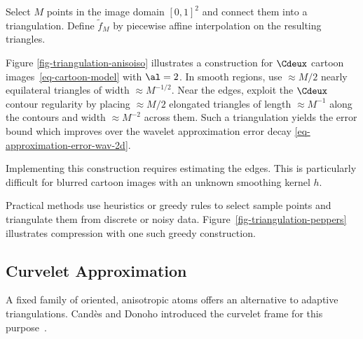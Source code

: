 
Select $M$ points in the image domain $[0,1]^2$ and connect them into a triangulation. Define $\tilde f_M$ by piecewise affine interpolation on the resulting triangles.


Figure \ref{fig-triangulation-anisoiso} illustrates a construction for $\Cdeux$ cartoon images~\eqref{eq-cartoon-model} with $\al=2$. In smooth regions, use $\approx M/2$ nearly equilateral triangles of width $\approx M^{-1/2}$. Near the edges, exploit the $\Cdeux$ contour regularity by placing $\approx M/2$ elongated triangles of length $\approx M^{-1}$ along the contours and width $\approx M^{-2}$ across them. Such a triangulation yields the error bound
which improves over the wavelet approximation error decay \eqref{eq-approximation-error-wav-2d}. 

Implementing this construction requires estimating the edges. This is particularly difficult for blurred cartoon images with an unknown smoothing kernel $h$.

Practical methods use heuristics or greedy rules to select sample points and triangulate them from discrete or noisy data.
Figure~\ref{fig-triangulation-peppers} illustrates compression with one such greedy construction.


\subsection{Curvelet Approximation}

A fixed family of oriented, anisotropic atoms offers an alternative to adaptive triangulations. Cand\`es and Donoho introduced the curvelet frame for this purpose~\cite{candes-tight-frame}.

